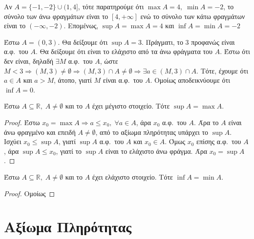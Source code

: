 \begin{example}
  Αν $ A= \{ -1,-2 \} \cup (1,4] $, τότε παρατηρούμε ότι $ \max A = 4, \; \min A =-2 $,
  το σύνολο των άνω φραγμάτων είναι το $ [4,+\infty] $ ενώ το σύνολο των κάτω φραγμάτων
  είναι το $ (-\infty,-2) $. Επομένως, $ \sup A= \max A=4 $ και 
  $ \inf A = \min A= -2 $
\end{example}

\begin{example}
  Έστω $ A = (0,3) $. Θα δείξουμε ότι $ \sup A = 3 $. Πράγματι, 
  το $ 3 $ προφανώς είναι α.φ.\ του $A$. Θα δείξουμε ότι είναι το
  ελάχιστο από τα άνω φράγματα του $A$. Έστω ότι δεν είναι, δηλαδή 
  $ \exists M $ α.φ.\ του $A$, ώστε $ M < 3 \Rightarrow (M,3) \neq 
  \emptyset \Rightarrow (M,3) \cap A \neq \emptyset \Rightarrow \exists 
  a \in (M,3) \cap A $. Τότε, έχουμε ότι $ a \in A $ και $ a > M $, 
  άτοπο, γιατί $M$ είναι α.φ.\ του $A$. Ομοίως αποδεικνύουμε ότι $ 
  \inf A = 0$.
\end{example}

\begin{mybox3}
\begin{prop}
  Έστω $ A \subseteq \mathbb{R}, \; A \neq \emptyset $ και το $A$ έχει μέγιστο 
  στοιχείο. Τότε $ \sup A = \max A $.
\end{prop}
\end{mybox3}
\begin{proof}
\item {}
  Έστω $ x_{0} = \max A \Rightarrow a \leq x_{0}, \; \forall a \in A $, άρα $ x_{0} $ α.φ.\
  του $A$. Άρα το $A$ είναι άνω φραγμένο και επειδή $ A \neq \emptyset $, από το αξίωμα
  πληρότητας υπάρχει το $ \sup A $. 
  Ισχύει $ x_{0} \leq \sup A $, γιατί $ \sup A $ α.φ.\ του $A$ και $ x_{0} \in A $.
  Όμως $ x_{0} $ επίσης α.φ.\ του $A$, άρα $ \sup A \leq x_{0} $, γιατί το $ \sup A $
  είναι το ελάχιστο άνω φράγμα.
  Άρα $ x_{0}= \sup A $.
\end{proof}

\begin{mybox3}
\begin{prop}
  Έστω $ A \subseteq \mathbb{R}, \; A \neq \emptyset $ και το $A$ έχει ελάχιστο
  στοιχείο. Τότε $ \inf A = \min A $.
\end{prop}
\end{mybox3}
\begin{proof}
  Ομοίως 
\end{proof}


\section{Αξίωμα Πληρότητας}

